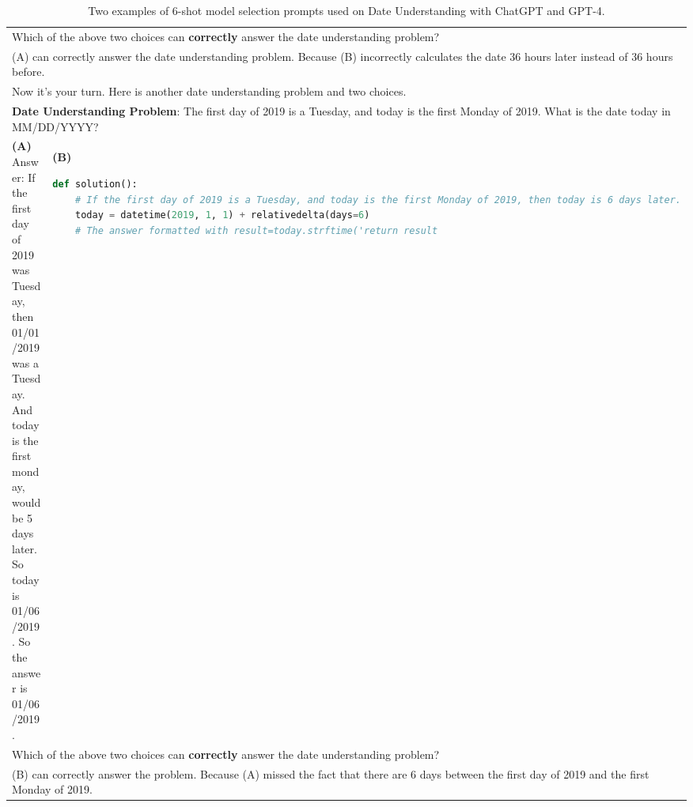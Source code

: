 \documentclass[11pt]{article}
\begin{document}
\begin{table*}[ht]
\begin{tabular}{p{}|p{}}
     \midrule
     \multicolumn{2}{p{0.92\textwidth}}{\small Which of the above two choices can \textbf{correctly} answer the date understanding problem?}\\
\multicolumn{2}{p{0.92\textwidth}}{\small (A) can correctly answer the date understanding problem. Because (B) incorrectly calculates the date 36 hours later instead of 36 hours before.}\\
          \midrule
        \multicolumn{2}{p{0.92\textwidth}}{\small Now it's your turn. Here is another date understanding problem and two choices. }\\
        \multicolumn{2}{p{0.92\textwidth}}{\small \textbf{Date Understanding Problem}: The first day of 2019 is a Tuesday, and today is the first Monday of 2019. What is the date today in MM/DD/YYYY? }\\
        \midrule
        \small \textbf{(A)} \newline
    \newline
    \small Answer: \newline
     \small If the first day of 2019 was Tuesday, then 01/01/2019 was a Tuesday. \newline
     \small And today is the first monday, would be 5 days later. \newline
     \small So today is 01/06/2019. \newline
     \small So the answer is 01/06/2019.\newline

     &
    \small \textbf{(B)} 
    \lstset{style=mystyle}
     \begin{lstlisting}[language=Python]
def solution():
    # If the first day of 2019 is a Tuesday, and today is the first Monday of 2019, then today is 6 days later.
    today = datetime(2019, 1, 1) + relativedelta(days=6)
    # The answer formatted with result=today.strftime('return result
     \end{lstlisting} \\
    \midrule
     \multicolumn{2}{p{0.92\textwidth}}{\small Which of the above two choices can \textbf{correctly} answer the date understanding problem?}\\
\multicolumn{2}{p{0.92\textwidth}}{\small (B) can correctly answer the problem. Because (A) missed the fact that there are 6 days between the first day of 2019 and the first Monday of 2019.}\\
     \bottomrule
    \end{tabular}
    \caption{Two examples of 6-shot model selection prompts used on Date Understanding with ChatGPT and GPT-4.}

    \label{tab:chatgpt_example_date}
\end{table*}
\end{document}

